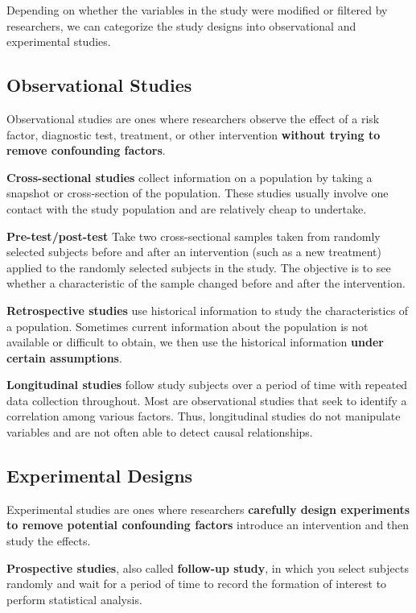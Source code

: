 \documentclass[
]{book}
\begin{document}
Depending on whether the variables in the study were modified or filtered by researchers, we can categorize the study designs into observational and experimental studies.

\hypertarget{observational-studies}{%
\subsection{Observational Studies}\label{observational-studies}}

Observational studies are ones where researchers observe the effect of a risk factor, diagnostic test, treatment, or other intervention \textbf{without trying to remove confounding factors}.

\textbf{Cross-sectional studies} collect information on a population by taking a snapshot or cross-section of the population. These studies usually involve one contact with the study population and are relatively cheap to undertake.

\textbf{Pre-test/post-test} Take two cross-sectional samples taken from randomly selected subjects before and after an intervention (such as a new treatment) applied to the randomly selected subjects in the study. The objective is to see whether a characteristic of the sample changed before and after the intervention.

\textbf{Retrospective studies} use historical information to study the characteristics of a population. Sometimes current information about the population is not available or difficult to obtain, we then use the historical information \textbf{under certain assumptions}.

\textbf{Longitudinal studies} follow study subjects over a period of time with repeated data collection throughout. Most are observational studies that seek to identify a correlation among various factors. Thus, longitudinal studies do not manipulate variables and are not often able to detect causal relationships.

\hypertarget{experimental-designs}{%
\subsection{Experimental Designs}\label{experimental-designs}}

Experimental studies are ones where researchers \textbf{carefully design experiments to remove potential confounding factors} introduce an intervention and then study the effects.

\textbf{Prospective studies}, also called \textbf{follow-up study}, in which you select subjects randomly and wait for a period of time to record the formation of interest to perform statistical analysis.
\end{document}

